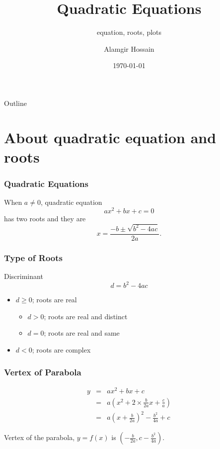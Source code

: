 \documentclass{beamer}
\title{Quadratic Equations}
\subtitle{equation, roots, plots}
\author{Alamgir Hossain}
\institute[] %
  {
  Assistant Professor (on study leave)\\
  Department of Mathematics\\
  Jagannath University, Bangladesh}
\date{\today}
\begin{document}
\begin{frame}
  \titlepage
\end{frame}

\begin{frame}{Outline}
  \tableofcontents
\end{frame}

\section{About quadratic equation and roots }    

\begin{frame}
  \frametitle{Quadratic Equations}
    When $a \ne 0$, quadratic equation \cite{anton2002calculus}
    $$ ax^2 + bx + c = 0 $$ has two roots and they are
    $$x = \frac{-b \pm \sqrt{b^2-4ac}}{2a}.$$
\end{frame}


\begin{frame}
  \frametitle{Type of Roots}

  \begin{block}{Discriminant}
    $$d = b^2-4ac$$
    \end{block}

  \begin{itemize}
  \item
    $d \ge 0$; roots are real
    \begin{itemize}
  \item
    $d > 0$; roots are real and distinct
  \item
    $d = 0$; roots are real and same
    \end{itemize}
  \item
    $d<0$; roots are complex
\end{itemize}

\end{frame}

\begin{frame}
  \frametitle{Vertex of Parabola}
  \[ \begin{array}{rcl}
    y & = & a x^{2}+bx+c\\
      & = & a\left(x^{2}+2\times\frac{b}{2a}x+\frac{c}{a}\right)\\
      & = & a\left(x+\frac{b}{2a}\right)^2 - \frac{b^2}{4a} + c
    \end{array}\]

   Vertex of the parabola, $y = f(x)$ is
   $\left(-\frac{b}{2a}, c - \frac{b^2}{4a}\right)$.
\end{frame}
\end{document}
